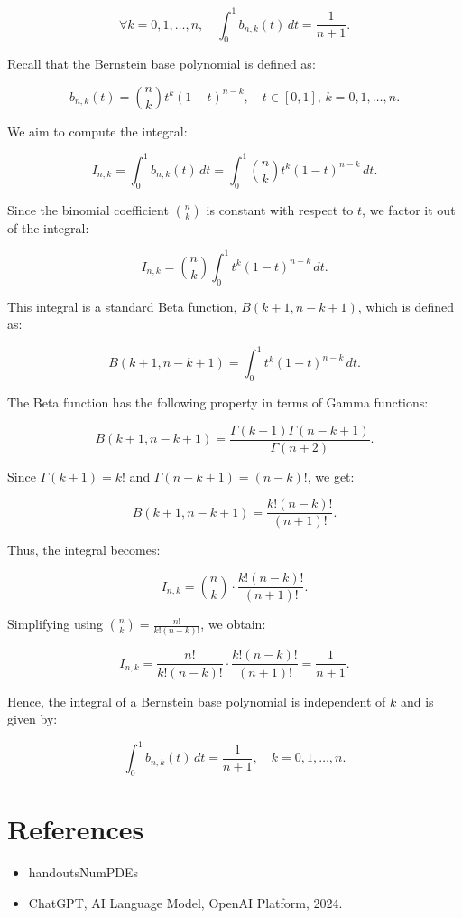 \documentclass[a4paper]{article}
\renewcommand{\qed}{\hfill \boxed{\mathbb{Q.E.D.}}}
\begin{document}
\[
\forall k = 0,1,\dots,n, \quad \int_0^1 b_{n,k}(t) \, dt = \frac{1}{n+1}.
\]

Recall that the Bernstein base polynomial is defined as:

\[
b_{n,k}(t) = \binom{n}{k} t^k (1 - t)^{n-k}, \quad t \in [0,1], \, k = 0,1,\dots,n.
\]

We aim to compute the integral:

\[
I_{n,k} = \int_0^1 b_{n,k}(t) \, dt = \int_0^1 \binom{n}{k} t^k (1 - t)^{n-k} \, dt.
\]

Since the binomial coefficient \( \binom{n}{k} \) is constant with respect to \( t \), we factor it out of the integral:

\[
I_{n,k} = \binom{n}{k} \int_0^1 t^k (1 - t)^{n-k} \, dt.
\]

This integral is a standard Beta function, \( B(k+1, n-k+1) \), which is defined as:

\[
B(k+1, n-k+1) = \int_0^1 t^k (1 - t)^{n-k} \, dt.
\]

The Beta function has the following property in terms of Gamma functions:

\[
B(k+1, n-k+1) = \frac{\Gamma(k+1)\Gamma(n-k+1)}{\Gamma(n+2)}.
\]

Since \( \Gamma(k+1) = k! \) and \( \Gamma(n-k+1) = (n-k)! \), we get:

\[
B(k+1, n-k+1) = \frac{k! (n-k)!}{(n+1)!}.
\]

Thus, the integral becomes:

\[
I_{n,k} = \binom{n}{k} \cdot \frac{k! (n-k)!}{(n+1)!}.
\]

Simplifying using \( \binom{n}{k} = \frac{n!}{k!(n-k)!} \), we obtain:

\[
I_{n,k} = \frac{n!}{k!(n-k)!} \cdot \frac{k!(n-k)!}{(n+1)!} = \frac{1}{n+1}.
\]

Hence, the integral of a Bernstein base polynomial is independent of \( k \) and is given by:

\[
\int_0^1 b_{n,k}(t) \, dt = \frac{1}{n+1}, \quad k = 0,1,\dots,n.
\]

\qed

\section*{References}
\begin{itemize}
   \item handoutsNumPDEs
   \item ChatGPT, AI Language Model, OpenAI Platform, 2024.
\end{itemize}
\end{document}
